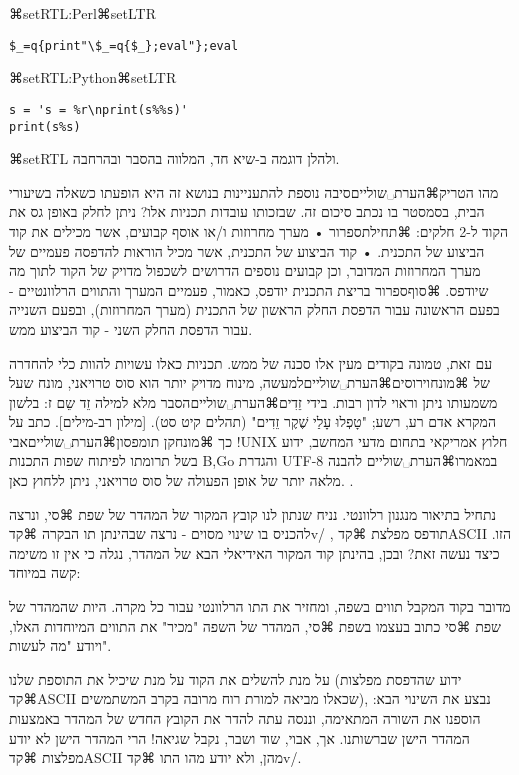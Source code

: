 {⌘setRTL{:Perl}⌘setLTR{}

\lstset{language=Perl}
\begin{lstlisting}[frame=single]
$_=q{print"\$_=q{$_};eval"};eval
\end{lstlisting}


⌘setRTL{:Python}⌘setLTR{}
\lstset{language=Python}
\begin{lstlisting}[frame=single]
s = 's = %r\nprint(s%%s)'
print(s%s)
\end{lstlisting}
⌘setRTL{}
ולהלן דוגמה ב-שיא חד, המלווה בהסבר ובהרחבה.



מהו הטריק⌘הערת␣שוליים{סיבה נוספת להתעניינות בנושא זה היא הופעתו כשאלה בשיעורי הבית, בסמסטר בו נכתב סיכום זה.} שבזכותו עובדות תכניות אלו? ניתן לחלק באופן גס את הקוד ל-2 חלקים: 
⌘תחילת{ספרור}
• מערך מחרוזות ו/או אוסף קבועים, אשר מכילים את קוד הביצוע של התכנית.
• קוד הביצוע של התכנית, אשר מכיל הוראות להדפסה פעמיים של מערך המחרוזות המדובר, וכן קבועים נוספים הדרושים לשכפול מדויק של הקוד לתוך מה שיודפס. 
⌘סוף{ספרור}
בריצת התכנית יודפס, כאמור, פעמיים המערך והתווים הרלוונטיים - בפעם הראשונה עבור הדפסת החלק הראשון של התכנית (מערך המחרוזות), ובפעם השנייה עבור הדפסת החלק השני - קוד הביצוע ממש. 

עם זאת, טמונה בקודים מעין אלו סכנה של ממש. תכניות כאלו עשויות להוות כלי להחדרה של ⌘מונח{וירוסים}⌘הערת␣שוליים{למעשה, מינוח מדויק יותר הוא סוס טרויאני, מונח שעל משמעותו ניתן וראוי לדון רבות.} בידי זֵדִים⌘הערת␣שוליים{הסבר מלא למילה זֵד שֵם ז: בלשון המקרא אדם רע, רשע; "טָפְלוּ עָלַי שֶׁקֶר זֵדִים" (תהלים קיט סט). [מילון רב-מילים]}. כתב על כך ⌘מונח{קן תומפסון}⌘הערת␣שוליים{אבי !UNIX חלוץ אמריקאי בתחום מדעי המחשב, ידוע בשל תרומתו לפיתוח שפות התכנות B,Go והגדרת UTF-8} במאמרו⌘הערת␣שוליים {להבנה מלאה יותר של אופן הפעולה של סוס טרויאני, ניתן ללחוץ כאן.
 }.

נתחיל בתיאור מנגנון רלוונטי. נניח שנתון לנו קובץ המקור של המהדר של שפת ⌘סי, ונרצה להכניס בו שינוי מסוים - נרצה שבהינתן תו הבקרה ⌘קד{v/} , תודפס מפלצת ⌘קד{ASCII} הזו. כיצד נעשה זאת? ובכן, בהינתן קוד המקור האידיאלי הבא של המהדר, נגלה כי אין זו משימה קשה במיוחד:

מדובר בקוד המקבל תווים בשפה, ומחזיר את התו הרלוונטי עבור כל מקרה. היות שהמהדר של שפת ⌘סי כתוב בעצמו בשפת ⌘סי, המהדר של השפה "מכיר" את התווים המיוחדות האלו, ויודע "מה לעשות". 

על מנת להשלים את הקוד על מנת שיכיל את התוספת שלנו (ידוע שהדפסת מפלצות ⌘קד{ASCII} שכאלו מביאה למורת רוח מרובה בקרב המשתמשים), נבצע את השינוי הבא: 
הוספנו את השורה המתאימה, וננסה עתה להדר את הקובץ החדש של המהדר באמצעות המהדר הישן שברשותנו. אך, אבוי, שוד ושבר, נקבל שגיאה! הרי המהדר הישן לא יודע מפלצות ⌘קד{ASCII} מהן, ולא יודע מהו התו ⌘קד{v/}. 

}
